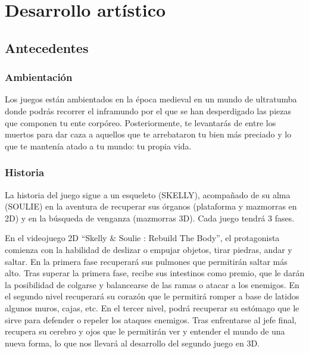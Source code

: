 \documentclass[12pt,a4paper,twoside,spanish]{article}      %
\begin{document}
\setlength{\parindent}{1,5cm} \setlength{\parskip}{0,7cm}



\section{Desarrollo artístico}
\subsection{Antecedentes}
\subsubsection{Ambientación}
Los juegos están ambientados en la época medieval en un mundo de ultratumba donde podrás recorrer el inframundo por el que se han desperdigado las piezas que componen tu ente corpóreo. Posteriormente, te levantarás de entre los muertos para dar caza a aquellos que te arrebataron tu bien más preciado y lo que te mantenía atado a tu mundo: tu propia vida.

\subsubsection{Historia}

La historia del juego sigue a un esqueleto (SKELLY), acompañado de su alma (SOULIE) en la aventura de recuperar sus órganos (plataforma y mazmorras en 2D) y en la búsqueda de venganza (mazmorras 3D). Cada juego tendrá 3 fases.\

En el videojuego 2D “Skelly \& Soulie : Rebuild The Body”, el protagonista comienza con la habilidad de deslizar o empujar objetos, tirar piedras, andar y saltar. En la primera fase recuperará sus pulmones que permitirán saltar más alto. Tras superar la primera fase, recibe sus intestinos como premio, que le darán la posibilidad de colgarse y balancearse de las ramas o atacar a los enemigos. En el segundo nivel recuperará su corazón que le permitirá romper a base de latidos algunos muros, cajas, etc. En el tercer nivel, podrá recuperar su estómago que le sirve para defender o repeler los ataques enemigos. Tras enfrentarse al jefe final, recupera su cerebro y ojos que le permitirán ver y entender el mundo de una nueva forma, lo que nos llevará al desarrollo del segundo juego en 3D.
\end{document}
